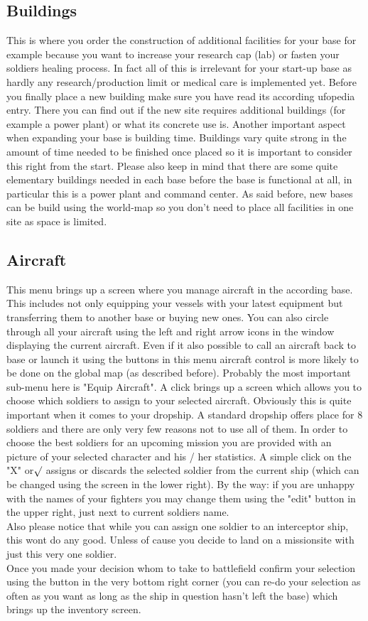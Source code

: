 \subsection{Buildings}
This is where you order the construction of additional facilities for your base for example because you want to increase your research cap (lab) or fasten your soldiers healing process.
In fact all of this is irrelevant for your start-up base as hardly any research/production limit or medical care is implemented yet. Before you finally place a new building make sure you have read its according ufopedia entry. There you can find out if the new site requires additional buildings (for example a power plant) or what its concrete use is. Another important aspect when expanding your base is building time. Buildings vary quite strong in the amount of time needed to be finished once placed so it is important to consider this right from the start. Please also keep in mind that there are some quite elementary buildings needed in each base before the base is functional at all, in particular this is a power plant and command center. As said before, new bases can be build using the world-map so you don't need to place all facilities in one site as space is limited.

\subsection{Aircraft}
This menu brings up a screen where you manage aircraft in the according base. This includes not only equipping your vessels with your latest equipment but transferring them to another base or buying new ones. You can also circle through all your aircraft using the left and right arrow icons in the window displaying the current aircraft. Even if it also possible to call an aircraft back to base or launch it using the buttons in this menu aircraft control is more likely to be done on the global map (as described before).
Probably the most important sub-menu here is "Equip Aircraft".  A click brings up a screen which allows you to choose which soldiers to assign to your selected aircraft. Obviously this is quite important when it comes to your dropship. A standard dropship offers place for 8 soldiers and there are only very few reasons not to use all of them. In order to choose the best soldiers for an upcoming mission you are provided with an picture of your selected character and his / her statistics. A simple click on the "X" or$\surd$ assigns or discards the selected soldier from the current ship (which can be changed using the screen in the lower right). By the way: if you are unhappy with the names of your fighters you may change them using the "edit" button in the upper right, just next to current soldiers name.\\
Also please notice that while you can assign one soldier to an interceptor ship, this wont do any good. Unless of cause you decide to land on a missionsite with just this very one soldier.\\
Once you made your decision whom to take to battlefield confirm your selection using the button in the very bottom right corner (you can re-do your selection as often as you want as long as the ship in question hasn't left the base) which brings up the inventory screen.


